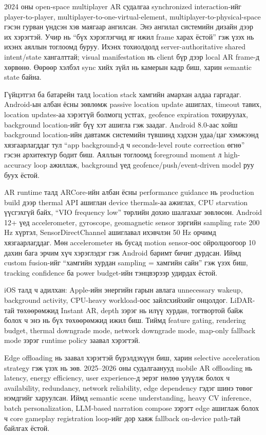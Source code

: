 \begin{sloppy}
2024 оны open-space multiplayer AR судалгаа synchronized interaction-ийг player-to-player, multiplayer-to-one-virtual-element, multiplayer-to-physical-space гэсэн гурван үндсэн хэв маягаар ангилсан. Энэ ангилал системийн дизайн дээр их хэрэгтэй. Учир нь ``бүх хэрэглэгчид яг ижил frame харах ёстой'' гэж үзэх нь ихэнх аяллын тоглоомд буруу. Ихэнх тохиолдолд server-authoritative shared intent/state хангалттай; visual manifestation нь client бүр дээр local AR frame-д хөрвөнө. Өөрөөр хэлбэл sync хийх зүйл нь камерын кадр биш, харин semantic state байна.

Гүйцэтгэл ба батарейн талд location stack хамгийн амархан алдаа гаргадаг. Android-ын албан ёсны зөвлөмж passive location update ашиглах, timeout тавих, location updates-аа хэрэггүй болмогц устгах, geofence expiration тохируулах, background location-ийг бүү хэт ашигла гэж заадаг. Android 8.0-аас хойш background location-ийн давтамж системийн түвшинд хэдхэн удаа/цаг хэмжээнд хязгаарлагддаг тул ``app background-д ч seconds-level route correction өгнө'' гэсэн архитектур бодит биш. Аяллын тоглоомд foreground moment л high-accuracy loop ажиллаж, background үед geofence/push/event-driven model руу буух ёстой.

AR runtime талд ARCore-ийн албан ёсны performance guidance нь production build дээр thermal API ашиглан device thermals-аа ажиглах, CPU starvation үүсгэхгүй байх, ``VIO frequency low'' төрлийн дохио шалгахыг зөвлөсөн. Android 12+ үед accelerometer, gyroscope, geomagnetic sensor зэргийн sampling rate 200 Hz хүртэл, SensorDirectChannel ашиглавал ихэвчлэн 50 Hz орчимд хязгаарлагддаг. Мөн accelerometer нь бусад motion sensor-оос ойролцоогоор 10 дахин бага эрчим хүч хэрэглэдэг гэж Android баримт бичиг дурдсан. Иймд custom fusion-ийг ``хамгийн хурдан sampling = хамгийн сайн'' гэж үзэх биш, tracking confidence ба power budget-ийн тэнцвэрээр удирдах ёстой.

iOS талд ч адилхан: Apple-ийн энергийн гарын авлага unnecessary wakeup, background activity, CPU-heavy workload-оос зайлсхийхийг онцолдог. LiDAR-тай төхөөрөмжид Instant AR, depth зэрэг нь илүү хурдан, тогтвортой байж болох ч энэ нь бүх төхөөрөмжид ижил биш. Тиймд feature gating, rendering budget, thermal downgrade mode, network downgrade mode, map-only fallback mode зэрэг runtime policy заавал хэрэгтэй.

Edge offloading нь заавал хэрэгтэй бүрэлдэхүүн биш, харин selective acceleration strategy гэж үзэх нь зөв. 2025--2026 оны судалгаанууд mobile AR offloading нь latency, energy efficiency, user experience-д эерэг нөлөө үзүүлж болох ч availability, redundancy, network reliability, edge dependency гэдэг шинэ төвөг нэмдгийг харуулсан. Иймд semantic scene understanding, heavy CV inference, batch personalization, LLM-based narration compose зэрэгт edge ашиглаж болох ч core gameplay registration loop-ийг дор хаяж fallback on-device path-тай байлгах ёстой.


\end{sloppy}
